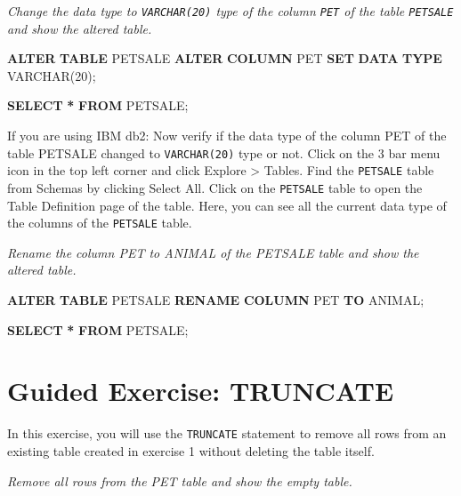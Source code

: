 \documentclass[
]{book}
\newenvironment{Shaded}{\begin{snugshade}}{\end{snugshade}}
\newcommand{\DataTypeTok}[1]{\textcolor[rgb]{0.13,0.29,0.53}{#1}}
\newcommand{\DecValTok}[1]{\textcolor[rgb]{0.00,0.00,0.81}{#1}}
\newcommand{\KeywordTok}[1]{\textcolor[rgb]{0.13,0.29,0.53}{\textbf{#1}}}
\newcommand{\NormalTok}[1]{#1}
\newcommand{\OperatorTok}[1]{\textcolor[rgb]{0.81,0.36,0.00}{\textbf{#1}}}
\begin{document}
{\emph{Change the data type to \texttt{VARCHAR(20)} type of the column \texttt{PET} of the table \texttt{PETSALE} and show the altered table.
}}

\begin{Shaded}
\begin{Highlighting}[]
\KeywordTok{ALTER} \KeywordTok{TABLE}\NormalTok{ PETSALE}
\KeywordTok{ALTER} \KeywordTok{COLUMN}\NormalTok{ PET }\KeywordTok{SET} \KeywordTok{DATA} \KeywordTok{TYPE} \DataTypeTok{VARCHAR}\NormalTok{(}\DecValTok{20}\NormalTok{);}

\KeywordTok{SELECT} \OperatorTok{*} \KeywordTok{FROM}\NormalTok{ PETSALE;}
\end{Highlighting}
\end{Shaded}

If you are using IBM db2:
Now verify if the data type of the column PET of the table PETSALE changed to \texttt{VARCHAR(20)} type or not. Click on the 3 bar menu icon in the top left corner and click Explore \textgreater{} Tables. Find the \texttt{PETSALE} table from Schemas by clicking Select All. Click on the \texttt{PETSALE} table to open the Table Definition page of the table. Here, you can see all the current data type of the columns of the \texttt{PETSALE} table.

{\emph{Rename the column PET to ANIMAL of the PETSALE table and show the altered table.
}}

\begin{Shaded}
\begin{Highlighting}[]
\KeywordTok{ALTER} \KeywordTok{TABLE}\NormalTok{ PETSALE}
\KeywordTok{RENAME} \KeywordTok{COLUMN}\NormalTok{ PET }\KeywordTok{TO}\NormalTok{ ANIMAL;}

\KeywordTok{SELECT} \OperatorTok{*} \KeywordTok{FROM}\NormalTok{ PETSALE;}
\end{Highlighting}
\end{Shaded}

\hypertarget{guided-exercise-truncate}{%
\section{Guided Exercise: TRUNCATE}\label{guided-exercise-truncate}}

In this exercise, you will use the \texttt{TRUNCATE} statement to remove all rows from an existing table created in exercise 1 without deleting the table itself.

{\emph{Remove all rows from the PET table and show the empty table.
}}
\end{document}
